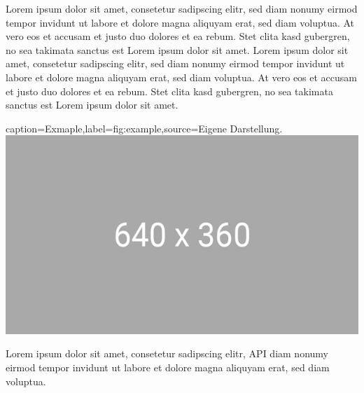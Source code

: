 Lorem ipsum dolor sit amet, consetetur sadipscing elitr, sed diam nonumy eirmod tempor invidunt ut labore et dolore magna aliquyam erat, sed diam voluptua. At vero eos et accusam et justo duo dolores et ea rebum. Stet clita kasd gubergren, no sea takimata sanctus est Lorem ipsum dolor sit amet. Lorem ipsum dolor sit amet, consetetur sadipscing elitr, sed diam nonumy eirmod tempor invidunt ut labore et dolore magna aliquyam erat, sed diam voluptua. At vero eos et accusam et justo duo dolores et ea rebum. Stet clita kasd gubergren, no sea takimata sanctus est Lorem ipsum dolor sit amet.

\begin{dhbwfigure}{caption=Exmaple,label=fig:example,source={Eigene Darstellung.}}
    \includegraphics[width=\textwidth]{assets/figures/example.jpg}
\end{dhbwfigure}

Lorem ipsum dolor sit amet, consetetur sadipscing elitr, \ac{API} diam nonumy eirmod tempor invidunt ut labore et dolore magna aliquyam erat, sed diam voluptua. 
